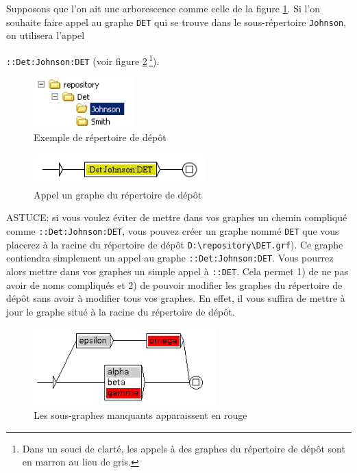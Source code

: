\bigskip
\noindent Supposons que l’on ait une arborescence comme celle de la figure \ref{repository}. Si l’on
souhaite faire appel au graphe \verb+DET+ qui se trouve dans le sous-répertoire \verb+Johnson+, on
utilisera l’appel

\noindent \verb+::Det:Johnson:DET+
(voir figure \ref{repository-graph-call}\,\footnote{Dans un souci de clarté, les appels
à des graphes du répertoire de dépôt sont en marron au lieu de gris.}).


\bigskip
\begin{figure}[!h]
\begin{center}
\includegraphics[width=3.9cm]{resources/img/fig5-11.png}
\caption{Exemple de répertoire de dépôt\label{repository}}
\end{center}
\end{figure}

\begin{figure}[!h]
\begin{center}
\includegraphics[width=6.7cm]{resources/img/fig5-12.png}
\caption{Appel un graphe du répertoire de dépôt\label{repository-graph-call}}
\end{center}
\end{figure}

\bigskip
\noindent ASTUCE: si vous voulez éviter de mettre dans vos graphes un chemin compliqué
comme \verb+::Det:Johnson:DET+, vous pouvez créer un graphe nommé \verb+DET+ que vous placerez à la
racine du répertoire de dépôt \verb+D:\repository\DET.grf+). Ce graphe contiendra simplement
un appel au graphe \verb+::Det:Johnson:DET+. Vous pourrez alors mettre dans vos graphes un simple
appel à \verb+::DET+. Cela permet 1) de ne pas avoir de noms compliqués et 2) de pouvoir modifier
les graphes du répertoire de dépôt sans avoir à modifier tous vos graphes. En effet, il vous suffira
de mettre à jour le graphe situé à la racine du répertoire de dépôt.


\begin{figure}[h!]
\begin{center}
\includegraphics[width=7cm]{resources/img/fig5-9.png}
\caption{Les sous-graphes manquants apparaissent en rouge}
\end{center}
\end{figure}

